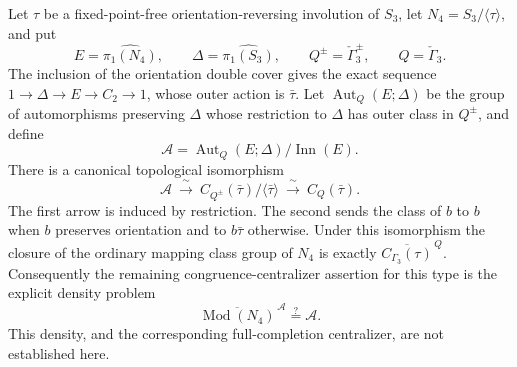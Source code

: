 \begin{proposition}\label{C-free-reflection-comparison}
Let $\tau$ be a fixed-point-free orientation-reversing
involution of $S_3$, let $N_4=S_3/\langle\tau\rangle$, and put
\[
 E=\widehat{\pi_1(N_4)},\qquad
 \Delta=\widehat{\pi_1(S_3)},\qquad
 Q^\pm=\check\Gamma_3^\pm,\qquad Q=\check\Gamma_3.
\]
The inclusion of the orientation double cover gives the
exact sequence $1\to\Delta\to E\to C_2\to1$, whose outer
action is $\bar\tau$.
Let $\operatorname{Aut}_Q(E;\Delta)$ be the group of
automorphisms preserving $\Delta$ whose restriction to
$\Delta$ has outer class in $Q^\pm$, and define
\[
 \mathcal A=\operatorname{Aut}_Q(E;\Delta)/
                         \operatorname{Inn}(E).
\]
There is a canonical topological isomorphism
\[
 \mathcal A
 \ \xrightarrow{\ \sim\ }\
 C_{Q^\pm}(\bar\tau)/\langle\bar\tau\rangle
 \ \xrightarrow{\ \sim\ }\
 C_Q(\bar\tau).
\tag{C.18.1}
\]
The first arrow is induced by restriction. The second
sends the class of $b$ to $b$ when $b$ preserves orientation
and to $b\bar\tau$ otherwise.
Under this isomorphism the closure of the ordinary mapping
class group of $N_4$ is exactly
$\overline{C_{\Gamma_3}(\tau)}^{\,Q}$.
Consequently the remaining congruence-centralizer assertion
for this type is the explicit density problem
\[
 \overline{\operatorname{Mod}(N_4)}^{\,\mathcal A}
                       \stackrel{?}{=}\mathcal A.
\tag{C.18.2}
\]
This density, and the corresponding full-completion
centralizer, are not established here.
\end{proposition}
